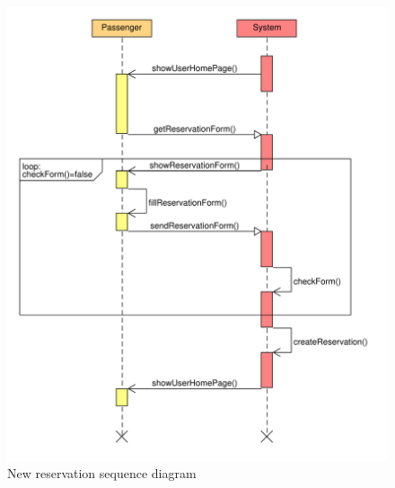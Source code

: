\begin{figure}
\centering
\includegraphics[width=\textwidth]{tex-images/sequence-new-reservation}
\caption{New reservation sequence diagram}
\end{figure}



